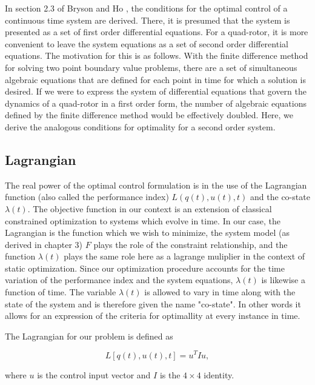     In section 2.3 of Bryson and Ho \cite{BrysonHo69}, the conditions for the optimal control of a continuous time system are derived. There, it is presumed that the system is  presented as a set of first order differential equations. For a quad-rotor, it is more convenient to leave the system equations as a set of second order differential equations. The motivation for this is as follows. With the finite difference method for solving two point boundary value problems, there are a set of simultaneous algebraic equations that are defined for each point in time for which a solution is desired. If we were to express the system of differential equations that govern the dynamics of a quad-rotor in a first order form, the number of algebraic equations defined by the finite difference method would be effectively doubled. Here, we derive the analogous conditions for optimality for a second order system.

\subsection{Lagrangian}

The real power of the optimal control formulation is in the use of the Lagrangian function (also called the performance index) $L(q(t),u(t),t)$ and the co-state $\lambda(t)$. The objective function in our context is an extension of classical constrained optimization to systems which evolve in time. In our case, the Lagrangian is the function which we wish to minimize, the system model (as derived in chapter 3) $F$ plays the role of the constraint relationship, and the function $\lambda(t)$ plays the same role here as a lagrange muliplier in the context of static optimization. Since our optimization procedure accounts for the time variation of the performance index and the system equations, $\lambda(t)$ is likewise a function of time. The variable  $\lambda(t)$  is allowed to vary in time along with the state of the system and is therefore given the name "co-state". In other words it allows for an expression of the criteria for optimallity at every instance in time.

The Lagrangian for our problem is defined as

\begin{equation}
    L[q(t),u(t),t] = u^T I u ,
\end{equation}

 where $u$ is the control input vector and $I$ is the $4\times4$ identity.






